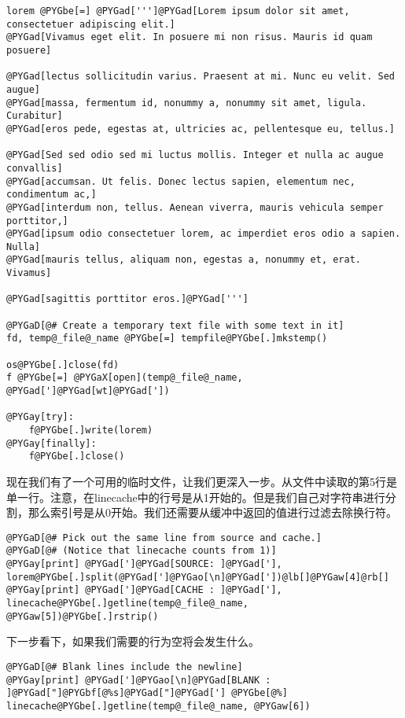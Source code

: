 \documentclass[a4paper,10pt,english]{manual}
\begin{document}
\begin{Verbatim}[commandchars=@\[\]]
lorem @PYGbe[=] @PYGad[''']@PYGad[Lorem ipsum dolor sit amet, consectetuer adipiscing elit.]
@PYGad[Vivamus eget elit. In posuere mi non risus. Mauris id quam posuere]

@PYGad[lectus sollicitudin varius. Praesent at mi. Nunc eu velit. Sed augue]
@PYGad[massa, fermentum id, nonummy a, nonummy sit amet, ligula. Curabitur]
@PYGad[eros pede, egestas at, ultricies ac, pellentesque eu, tellus.]

@PYGad[Sed sed odio sed mi luctus mollis. Integer et nulla ac augue convallis]
@PYGad[accumsan. Ut felis. Donec lectus sapien, elementum nec, condimentum ac,]
@PYGad[interdum non, tellus. Aenean viverra, mauris vehicula semper porttitor,]
@PYGad[ipsum odio consectetuer lorem, ac imperdiet eros odio a sapien. Nulla]
@PYGad[mauris tellus, aliquam non, egestas a, nonummy et, erat. Vivamus]

@PYGad[sagittis porttitor eros.]@PYGad[''']

@PYGaD[@# Create a temporary text file with some text in it]
fd, temp@_file@_name @PYGbe[=] tempfile@PYGbe[.]mkstemp()

os@PYGbe[.]close(fd)
f @PYGbe[=] @PYGaX[open](temp@_file@_name, @PYGad[']@PYGad[wt]@PYGad['])

@PYGay[try]:
    f@PYGbe[.]write(lorem)
@PYGay[finally]:
    f@PYGbe[.]close()
\end{Verbatim}

现在我们有了一个可用的临时文件，让我们更深入一步。从文件中读取的第5行是单一行。注意，在linecache中的行号是从1开始的。但是我们自己对字符串进行分割，那么索引号是从0开始。我们还需要从缓冲中返回的值进行过滤去除换行符。

\begin{Verbatim}[commandchars=@\[\]]
@PYGaD[@# Pick out the same line from source and cache.]
@PYGaD[@# (Notice that linecache counts from 1)]
@PYGay[print] @PYGad[']@PYGad[SOURCE: ]@PYGad['], lorem@PYGbe[.]split(@PYGad[']@PYGao[\n]@PYGad['])@lb[]@PYGaw[4]@rb[]
@PYGay[print] @PYGad[']@PYGad[CACHE : ]@PYGad['], linecache@PYGbe[.]getline(temp@_file@_name, @PYGaw[5])@PYGbe[.]rstrip()
\end{Verbatim}

下一步看下，如果我们需要的行为空将会发生什么。

\begin{Verbatim}[commandchars=@\[\]]
@PYGaD[@# Blank lines include the newline]
@PYGay[print] @PYGad[']@PYGao[\n]@PYGad[BLANK : ]@PYGad["]@PYGbf[@%s]@PYGad["]@PYGad['] @PYGbe[@%] linecache@PYGbe[.]getline(temp@_file@_name, @PYGaw[6])
\end{Verbatim}
\end{document}
